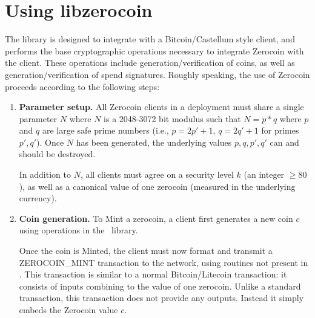 \section{Using libzerocoin}

The \libzerocoin library is designed to integrate with a Bitcoin/Castellum style client, and performs the base cryptographic operations necessary to integrate Zerocoin with the client. These operations include generation/verification of coins, as well as generation/verification of spend signatures. Roughly speaking, the use of Zerocoin proceeds according to the following steps:

\begin{enumerate}
\item {\bf Parameter setup.} All Zerocoin clients in a deployment must share a single parameter $N$ where $N$ is a 2048-3072 bit modulus such that $N = p*q$ where $p$ and $q$ are large safe prime numbers (i.e., $p = 2p'+1$, $q = 2q'+1$ for primes $p', q'$). Once $N$ has been generated, the underlying values $p, q, p', q'$ can and should be destroyed.

In addition to $N$, all clients must agree on a security level $k$ (an integer $\ge 80$), as well as a canonical value of one zerocoin (measured in the underlying currency).

\item {\bf Coin generation.} To Mint a zerocoin, a client first generates a new coin $c$ using operations in the \libzerocoin~library.

Once the coin is Minted, the client must now format and transmit a \textsf{ZEROCOIN\_MINT} transaction to the network, using routines not present in \libzerocoin. This transaction is similar to a normal Bitcoin/Litecoin transaction: it consists of inputs combining to the value of one zerocoin. Unlike a standard transaction, this transaction does not provide any outputs. Instead it simply embeds the Zerocoin value $c$.

\end{enumerate}
